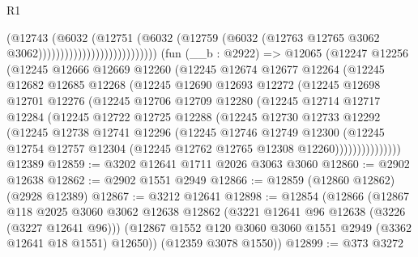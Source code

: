 \begin{lexlean}{R1}
\begin{coremodule}
                                            (@12743
                                              (@6032
                                                (@12751
                                                  (@6032
                                                    (@12759
                                                      (@6032
                                                        (@12763
                                                          @12765
                                                          @3062
                                                          @3062)))))))))))))))))))))))))))
    (fun (__b : @2922) =>
    @12065
      (@12247
        @12256
        (@12245
          @12666
          @12669
          @12260
          (@12245
            @12674
            @12677
            @12264
            (@12245
              @12682
              @12685
              @12268
              (@12245
                @12690
                @12693
                @12272
                (@12245
                  @12698
                  @12701
                  @12276
                  (@12245
                    @12706
                    @12709
                    @12280
                    (@12245
                      @12714
                      @12717
                      @12284
                      (@12245
                        @12722
                        @12725
                        @12288
                        (@12245
                          @12730
                          @12733
                          @12292
                          (@12245
                            @12738
                            @12741
                            @12296
                            (@12245
                              @12746
                              @12749
                              @12300
                              (@12245
                                @12754
                                @12757
                                @12304
                                (@12245 @12762 @12765 @12308 @12260)))))))))))))))
    @12389
@12859 := @3202 @12641 @1711 @2026 @3063 @3060
@12860 := @2902 @12638
@12862 := @2902 @1551 @2949
@12866 := @12859 (@12860 @12862) (@2928 @12389)
@12867 := @3212 @12641
@12898 := @12854
    (@12866
      (@12867
        @118
        @2025
        @3060
        @3062
        @12638
        @12862
        (@3221 @12641 @96 @12638 (@3226 (@3227 @12641 @96)))
        (@12867 @1552 @120 @3060 @3060 @1551 @2949 (@3362 @12641 @18 @1551) @12650))
      (@12359 @3078 @1550))
@12899 := @373 @3272

\end{coremodule}
\end{lexlean}
